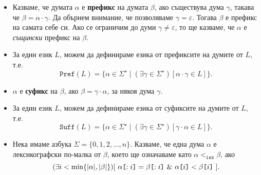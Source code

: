 \begin{itemize}
\item 
  Казваме, че думата $\alpha$ е {\bf префикс} на думата $\beta$,
  ако съществува дума $\gamma$, такава че $\beta = \alpha\cdot\gamma$.
  Да обърнем внимание, че позволяваме $\gamma = \varepsilon$. Тогава $\beta$ е префикс на самата себе си.
  Ако се ограничим до думи $\gamma \neq \varepsilon$, то ще казваме, че $\alpha$ е \emph{същински} префикс на $\beta$.
\item
  За един език $L$, можем да дефинираме езика от префиксите на думите от $L$, т.е.
  \[\texttt{Pref}(L) = \{\alpha \in \Sigma^\star \mid (\exists \gamma \in \Sigma^\star)[\alpha\cdot \gamma \in L]\}.\]
\item
  $\alpha$ е {\bf суфикс} на $\beta$, ако $\beta = \gamma\cdot\alpha$, за някоя дума $\gamma$.
\item
  За един език $L$, можем да дефинираме езика от суфиксите на думите от $L$, т.е.
  \[\texttt{Suff}(L) = \{\alpha \in \Sigma^\star \mid (\exists \gamma \in \Sigma^\star)[\gamma\cdot\alpha \in L]\}.\]
\item
  Нека имаме азбука $\Sigma = \{0,1,2,\dots,n\}$.
  Казваме, че една дума $\alpha$ е лексикографски по-малка от $\beta$, което ще означаваме като $\alpha <_{\texttt{lex}} \beta$, ако
  \[(\exists i < \min\{|\alpha|,|\beta|\})[\ \alpha\slice{:i} = \beta\slice{:i}\ \&\ \alpha\slice{i} < \beta\slice{i}\ ].\]
\end{itemize}




